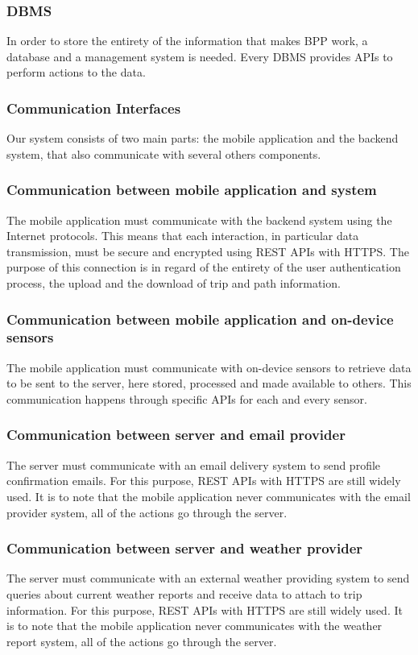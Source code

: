 \subsubsection*{DBMS}
In order to store the entirety of the information that makes BPP work, a database and a management system is needed. Every DBMS provides APIs to perform actions to the data.

\subsubsection{Communication Interfaces}
Our system consists of two main parts: the mobile application and the backend system, that also communicate with several others components.

\subsubsection*{Communication between mobile application and system}
The mobile application must communicate with the backend system using the Internet protocols. This means that each interaction, in particular data transmission, must be secure and encrypted using REST APIs with HTTPS.
The purpose of this connection is in regard of the entirety of the user authentication process, the upload and the download of trip and path information.

\subsubsection*{Communication between mobile application and on-device sensors}
The mobile application must communicate with on-device sensors to retrieve data to be sent to the server, here stored, processed and made available to others. This communication happens through specific APIs for each and every sensor.

\subsubsection*{Communication between server and email provider}
The server must communicate with an email delivery system to send profile confirmation emails. For this purpose, REST APIs with HTTPS are still widely used. It is to note that the mobile application never communicates with the email provider system, all of the actions go through the server.

\subsubsection*{Communication between server and weather provider}
The server must communicate with an external weather providing system to send queries about current weather reports and receive data to attach to trip information. For this purpose, REST APIs with HTTPS are still widely used. It is to note that the mobile application never communicates with the weather report system, all of the actions go through the server.

